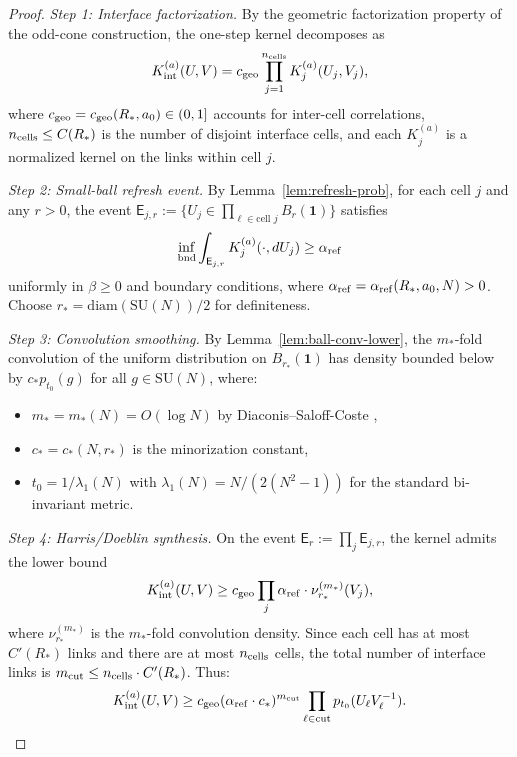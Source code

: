 \documentclass[11pt]{amsart}
\theoremstyle{plain}
\theoremstyle{definition}
\theoremstyle{remark}
\begin{document}
\begin{proof}
\emph{Step 1: Interface factorization.} By the geometric factorization property of the odd-cone construction, the one-step kernel decomposes as
\[
  K_{\rm int}^{(a)}(U,V) = c_{\rm geo} \prod_{j=1}^{n_{\rm cells}} K_j^{(a)}(U_j,V_j),
\]
where $c_{\rm geo} = c_{\rm geo}(R_*,a_0) \in (0,1]$ accounts for inter-cell correlations, $n_{\rm cells} \le C(R_*)$ is the number of disjoint interface cells, and each $K_j^{(a)}$ is a normalized kernel on the links within cell $j$.

\emph{Step 2: Small-ball refresh event.} By Lemma~\ref{lem:refresh-prob}, for each cell $j$ and any $r > 0$, the event $\mathsf{E}_{j,r} := \{U_j \in \prod_{\ell \in \text{cell } j} B_r(\mathbf{1})\}$ satisfies
\[
  \inf_{\text{bnd}} \int_{\mathsf{E}_{j,r}} K_j^{(a)}(\cdot, dU_j) \ge \alpha_{\rm ref}
\]
uniformly in $\beta \ge 0$ and boundary conditions, where $\alpha_{\rm ref} = \alpha_{\rm ref}(R_*,a_0,N) > 0$. Choose $r_* = \text{diam}(\mathrm{SU}(N))/2$ for definiteness.

\emph{Step 3: Convolution smoothing.} By Lemma~\ref{lem:ball-conv-lower}, the $m_*$-fold convolution of the uniform distribution on $B_{r_*}(\mathbf{1})$ has density bounded below by $c_* p_{t_0}(g)$ for all $g \in \mathrm{SU}(N)$, where:
\begin{itemize}
  \item $m_* = m_*(N) = O(\log N)$ by Diaconis--Saloff-Coste \cite{DiaconisSaloffCoste2004},
  \item $c_* = c_*(N,r_*)$ is the minorization constant,
  \item $t_0 = 1/\lambda_1(N)$ with $\lambda_1(N) = N/(2(N^2-1))$ for the standard bi-invariant metric.
\end{itemize}

\emph{Step 4: Harris/Doeblin synthesis.} On the event $\mathsf{E}_r := \prod_{j} \mathsf{E}_{j,r}$, the kernel admits the lower bound
\[
  K_{\rm int}^{(a)}(U,V) \ge c_{\rm geo} \prod_{j} \alpha_{\rm ref} \cdot \nu_{r_*}^{(m_*)}(V_j),
\]
where $\nu_{r_*}^{(m_*)}$ is the $m_*$-fold convolution density. Since each cell has at most $C'(R_*)$ links and there are at most $n_{\rm cells}$ cells, the total number of interface links is $m_{\rm cut} \le n_{\rm cells} \cdot C'(R_*)$. Thus:
\[
  K_{\rm int}^{(a)}(U,V) \ge c_{\rm geo} (\alpha_{\rm ref} \cdot c_*)^{m_{\rm cut}} \prod_{\ell \in \text{cut}} p_{t_0}(U_\ell V_\ell^{-1}).
\]


\end{proof}
\end{document}
